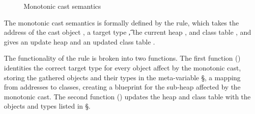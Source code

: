 \documentclass[a4paper,USenglish]{tex/lipics-v2016}
\begin{document}

\begin{figure}
\begin{mathpar}
\end{mathpar}
\caption{Monotonic cast semantics}
\label{fig:mono_sem}
\end{figure}

The monotonic cast semantics is formally defined by the  rule, 
which takes the address of the cast object \a, a target type \t, the current heap \s, 
and class table \K, and gives an update heap \sp and an updated class table \Kp.

The functionality of the  rule is broken into two functions.
The first function () identities the correct target type for every object affect by
the monotonic cast, storing the gathered objects and their types in the meta-variable \S, 
a mapping from addresses to classes, creating a blueprint for the sub-heap affected 
by the monotonic cast. The second function () updates the heap and class table with the
objects and types listed in \S.
\end{document}
